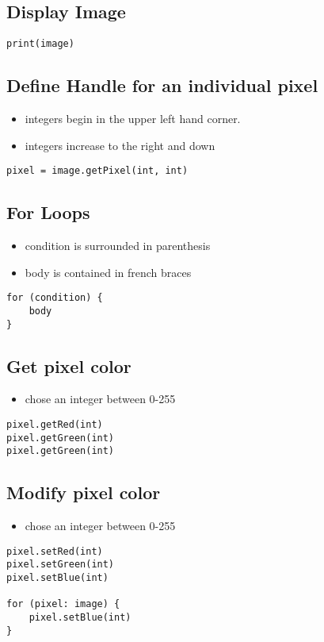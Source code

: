 \documentclass{article}
\begin{document}
\subsection{Display Image}
\begin{lstlisting}
print(image)
\end{lstlisting}

\subsection{Define Handle for an individual pixel}
    \begin{itemize}
      \item integers begin in the upper left hand corner.
      \item integers increase to the right and down
    \end{itemize}
\begin{lstlisting}
pixel = image.getPixel(int, int)
\end{lstlisting}

\subsection{For Loops}
\begin{itemize}
  \item condition is surrounded in parenthesis
  \item body is contained in french braces
\end{itemize}
\begin{lstlisting}
for (condition) {
    body
}
\end{lstlisting}

\subsection{Get pixel color}
\begin{itemize}
  \item chose an integer between 0-255
\end{itemize}

\begin{lstlisting}
pixel.getRed(int)
pixel.getGreen(int)
pixel.getGreen(int)
\end{lstlisting}

\subsection{Modify pixel color}
\begin{itemize}
  \item chose an integer between 0-255
\end{itemize}
\begin{lstlisting}
pixel.setRed(int)
pixel.setGreen(int)
pixel.setBlue(int)

for (pixel: image) {
    pixel.setBlue(int)
}
\end{lstlisting}
\end{document}
